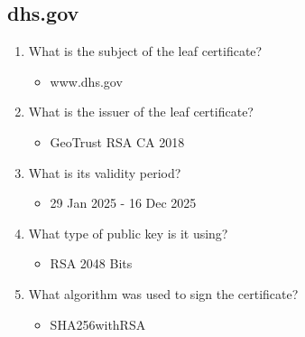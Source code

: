 \documentclass[11pt]{article}
\begin{document}
\subsection{dhs.gov}
\label{sec:org986025b}
\begin{enumerate}
\item What is the subject of the leaf certificate?
\begin{itemize}
\item www.dhs.gov
\end{itemize}
\item What is the issuer of the leaf certificate?
\begin{itemize}
\item GeoTrust RSA CA 2018
\end{itemize}
\item What is its validity period?
\begin{itemize}
\item 29 Jan 2025 - 16 Dec 2025
\end{itemize}
\item What type of public key is it using?
\begin{itemize}
\item RSA 2048 Bits
\end{itemize}
\item What algorithm was used to sign the certificate?
\begin{itemize}
\item SHA256withRSA
\end{itemize}
\end{enumerate}
\end{document}

